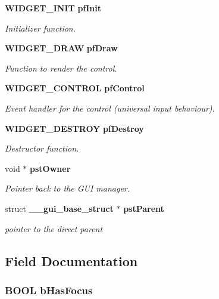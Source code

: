\begin{DoxyCompactItemize}
{\bf WIDGET\_\-INIT} {\bf pfInit}
\begin{DoxyCompactList}\small\item\em Initializer function. \item\end{DoxyCompactList}\item 
{\bf WIDGET\_\-DRAW} {\bf pfDraw}
\begin{DoxyCompactList}\small\item\em Function to render the control. \item\end{DoxyCompactList}\item 
{\bf WIDGET\_\-CONTROL} {\bf pfControl}
\begin{DoxyCompactList}\small\item\em Event handler for the control (universal input behaviour). \item\end{DoxyCompactList}\item 
{\bf WIDGET\_\-DESTROY} {\bf pfDestroy}
\begin{DoxyCompactList}\small\item\em Destructor function. \item\end{DoxyCompactList}\item 
void $\ast$ {\bf pstOwner}
\begin{DoxyCompactList}\small\item\em Pointer back to the GUI manager. \item\end{DoxyCompactList}\item 
struct {\bf \_\-\_\-gui\_\-base\_\-struct} $\ast$ {\bf pstParent}
\begin{DoxyCompactList}\small\item\em pointer to the direct parent \item\end{DoxyCompactList}\end{DoxyCompactItemize}


\subsection{Field Documentation}
\subsubsection[{bHasFocus}]{\setlength{\rightskip}{0pt plus 5cm}BOOL {\bf bHasFocus}}\label{struct____gui__base__struct_a62d0364edd806ac4a541306f364ddc69}


